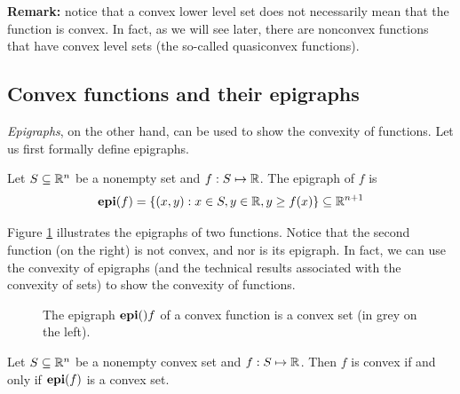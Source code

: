 {\bf Remark:} notice that a convex lower level set does not necessarily mean that the function is convex. In fact, as we will see later, there are nonconvex functions that have convex level sets (the so-called quasiconvex functions).  

\subsection{Convex functions and their epigraphs}

\emph{Epigraphs}, on the other hand, can be used to show the convexity of functions. Let us first formally define epigraphs.
%
\begin{definition}[Ephigraph]
	Let $S \subseteq \mathbb{R}^n$\hspace{-1pt} be a nonempty set and $f:S \mapsto \mathbb{R}$.\hspace{-1pt} The epigraph of $f$ is $$ \mathop{\bf epi}(f) = \left\{ (x, y) : x \in S, y \in \mathbb{R}, y \geq f(x) \right \} \subseteq \mathbb{R}^{n+1}
$$
\end{definition}
%
Figure \ref{fig:epigraphs} illustrates the epigraphs of two functions. Notice that the second function (on the right) is not convex, and nor is its epigraph. In fact, we can use the convexity of epigraphs (and the technical results associated with the convexity of sets) to show the convexity of functions.
% 
\begin{figure}
	\caption{The epigraph $\mathop{\bf epi}()f$ of a convex function is a convex set (in grey on the left).}\label{fig:epigraphs}
\end{figure}
%
\begin{theorem}\label{thm:convex_epi}
	Let $S \subseteq \mathbb{R}^n$ be a nonempty convex set and $f:S \mapsto \mathbb{R}$. Then $f$ is convex if and only if $\mathop{\bf epi}(f)$ is a convex set.
\end{theorem}
